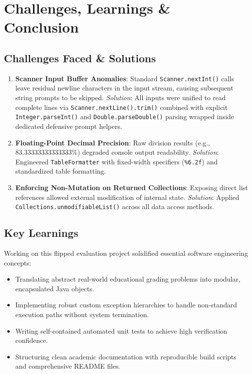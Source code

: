 \documentclass[12pt,a4paper]{report}
\begin{document}
\chapter{Challenges, Learnings \& Conclusion}

\section{Challenges Faced \& Solutions}
\begin{enumerate}
    \item \textbf{Scanner Input Buffer Anomalies}: Standard \texttt{Scanner.nextInt()} calls leave residual newline characters in the input stream, causing subsequent string prompts to be skipped. 
    \textit{Solution}: All inputs were unified to read complete lines via \texttt{Scanner.nextLine().trim()} combined with explicit \texttt{Integer.parseInt()} and \texttt{Double.parseDouble()} parsing wrapped inside dedicated defensive prompt helpers.
    \item \textbf{Floating-Point Decimal Precision}: Raw division results (e.g., $83.33333333333333\%$) degraded console output readability.
    \textit{Solution}: Engineered \texttt{TableFormatter} with fixed-width specifiers (\texttt{\%6.2f}) and standardized table formatting.
    \item \textbf{Enforcing Non-Mutation on Returned Collections}: Exposing direct list references allowed external modification of internal state.
    \textit{Solution}: Applied \texttt{Collections.unmodifiableList()} across all data access methods.
\end{enumerate}

\section{Key Learnings}
Working on this flipped evaluation project solidified essential software engineering concepts:
\begin{itemize}
    \item Translating abstract real-world educational grading problems into modular, encapsulated Java objects.
    \item Implementing robust custom exception hierarchies to handle non-standard execution paths without system termination.
    \item Writing self-contained automated unit tests to achieve high verification confidence.
    \item Structuring clean academic documentation with reproducible build scripts and comprehensive README files.
\end{itemize}
\end{document}
